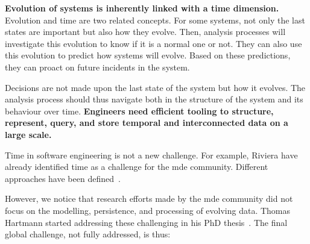 \textbf{Evolution of systems is inherently linked with a time dimension.}
Evolution and time are two related concepts.
For some systems, not only the last states are important but also how they evolve.
Then, analysis processes will investigate this evolution to know if it is a normal one or not.
They can also use this evolution to predict how systems will evolve.
Based on these predictions, they can proact on future incidents in the system.

Decisions are not made upon the last state of the system but how it evolves.
The analysis process should thus navigate both in the structure of the system and its behaviour over time.
\textbf{Engineers need efficient tooling to structure, represent, query, and store temporal and interconnected data on a large scale.}

Time in software engineering is not a new challenge.
For example, Riviera \etal \cite{DBLP:conf/models/RiveraRV08} have already identified time as a challenge for the \gls{mde} community.
Different approaches have been defined~\cite{DBLP:conf/sle/BousseCCGB15, DBLP:conf/sle/KansoT12, DBLP:conf/icse/KoegelH10, DBLP:conf/seke/0001FNMKT14}.

However, we notice that research efforts made by the \gls{mde} community did not focus on the modelling, persistence, and processing of evolving data.
Thomas Hartmann started addressing these challenging in his PhD thesis~\cite{DBLP:phd/basesearch/Hartmann16}.
The final global challenge, not fully addressed, is thus:
\vspace{-2em}
